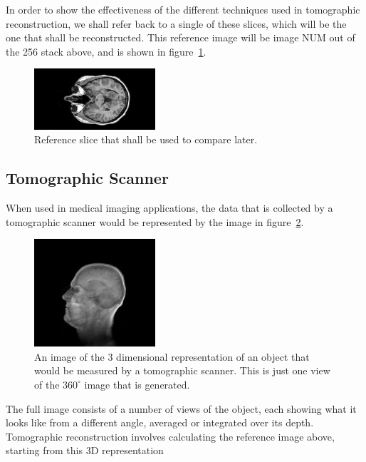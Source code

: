     In order to show the effectiveness of the different techniques used in tomographic reconstruction, we shall refer back to a single of these slices, which will be the one that shall be reconstructed. This reference image will be image NUM out of the 256 stack above, and is shown in figure~\ref{fig:reference_slice}.
    \begin{figure}[ht]
        \centering
        \includegraphics[width=0.4\textwidth]{Files/report_images/reference_slice.jpg}
        \caption{Reference slice that shall be used to compare later.\label{fig:reference_slice}}
    \end{figure}

    \subsection{Tomographic Scanner} %
    \label{sub:tomographic_scanner}
        When used in medical imaging applications, the data that is collected by a tomographic scanner would be represented by the image in figure~\ref{fig:3d_scan_example}.
        \begin{figure}[ht]
            \centering
                \includegraphics[width=0.4\textwidth]{Files/report_images/3D_scan_example.jpg}
            \caption{An image of the 3 dimensional representation of an object that would be measured by a tomographic scanner. This is just one view of the $360^{\circ}$ image that is generated.\label{fig:3d_scan_example}}
        \end{figure}

        The full image consists of a number of views of the object, each showing what it looks like from a different angle, averaged or integrated over its depth. Tomographic reconstruction involves calculating the reference image above, starting from this 3D representation

